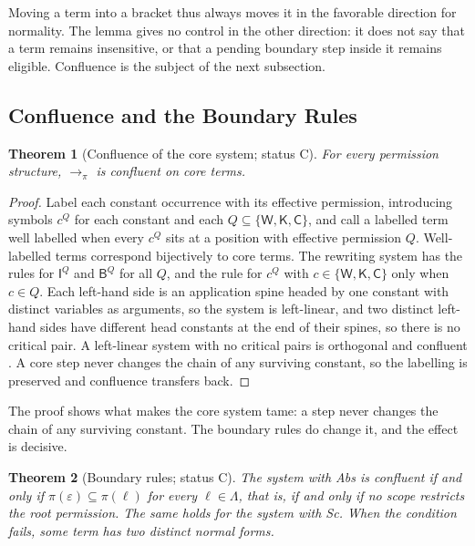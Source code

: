 \documentclass[11pt]{article}
\newtheorem{theorem}{Theorem}[section]
\theoremstyle{definition}
\theoremstyle{remark}
\newcommand{\cI}{\mathsf{I}}
\newcommand{\cB}{\mathsf{B}}
\newcommand{\cC}{\mathsf{C}}
\newcommand{\cK}{\mathsf{K}}
\newcommand{\cW}{\mathsf{W}}
\newcommand{\Ct}{status C}
\begin{document}
Moving a term into a bracket thus always moves it in the favorable direction for normality. The lemma gives no control in the other direction: it does not say that a term remains insensitive, or that a pending boundary step inside it remains eligible. Confluence is the subject of the next subsection.

\subsection{Confluence and the Boundary Rules}

\begin{theorem}[Confluence of the core system; \Ct]\label{thm:core}
For every permission structure, $\to_\pi$ is confluent on core terms.
\end{theorem}

\begin{proof}
Label each constant occurrence with its effective permission, introducing symbols $c^Q$ for each constant and each $Q\subseteq\{\cW,\cK,\cC\}$, and call a labelled term well labelled when every $c^Q$ sits at a position with effective permission $Q$. Well-labelled terms correspond bijectively to core terms. The rewriting system has the rules for $\cI^Q$ and $\cB^Q$ for all $Q$, and the rule for $c^Q$ with $c\in\{\cW,\cK,\cC\}$ only when $c\in Q$. Each left-hand side is an application spine headed by one constant with distinct variables as arguments, so the system is left-linear, and two distinct left-hand sides have different head constants at the end of their spines, so there is no critical pair. A left-linear system with no critical pairs is orthogonal and confluent \citep{huet1980,terese2003}. A core step never changes the chain of any surviving constant, so the labelling is preserved and confluence transfers back.
\end{proof}

The proof shows what makes the core system tame: a step never changes the chain of any surviving constant. The boundary rules do change it, and the effect is decisive.

\begin{theorem}[Boundary rules; \Ct]\label{thm:abs}
The system with Abs is confluent if and only if $\pi(\varepsilon)\subseteq\pi(\ell)$ for every $\ell\in\Lambda$, that is, if and only if no scope restricts the root permission. The same holds for the system with Sc. When the condition fails, some term has two distinct normal forms.
\end{theorem}
\end{document}
